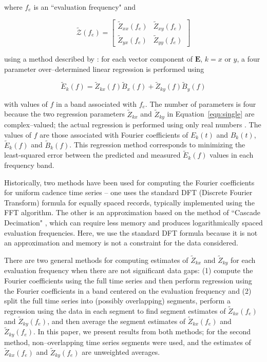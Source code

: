 \documentclass[pdflatex,sn-basic]{sn-jnl}%
\begin{document}
\noindent where $f_e$ is an ``evaluation frequency" and

\begin{equation}
  \boldsymbol{\mathcal{\widetilde{Z}}}(f_e) = 
    \begin{bmatrix}
      \widetilde{Z}_{xx}(f_e) & \widetilde{Z}_{xy}(f_e)\\
      \widetilde{Z}_{yx}(f_e) & \widetilde{Z}_{yy}(f_e)
    \end{bmatrix}
\end{equation}

\noindent using a method described by \cite{Sims1971}: for each vector component of $\mathbf{E}$, $k=x\mbox{ or }y$, a four parameter over--determined linear regression is performed using

\begin{equation}
  \widetilde{E}_k(f) = \widetilde{Z}_{kx}(f)\widetilde{B}_x(f) + \widetilde{Z}_{ky}(f)\widetilde{B}_y(f)
  \label{eqn:single}
\end{equation}

\noindent with values of $f$ in a band associated with $f_e$. The number of parameters is four because the two regression parameters $\widetilde{Z}_{kx}$ and $\widetilde{Z}_{ky}$ in Equation~\ref{eqn:single} are complex--valued; the actual regression is performed using only real numbers \citep{Egbert1986}. The values of $f$ are those associated with Fourier coefficients of $E_k(t)$ and $B_k(t)$, $\widetilde{E}_k(f)$ and $\widetilde{B}_k(f)$. This regression method corresponds to minimizing the least-squared error between the predicted and measured $\widetilde{E}_k(f)$ values in each frequency band.

Historically, two methods have been used for computing the Fourier coefficients for uniform cadence time series -- one uses the standard DFT (Discrete Fourier Transform) formula for equally spaced records, typically implemented using the FFT algorithm. The other is an approximation based on the method of ``Cascade Decimation" \citep{Wight1980}, which can require less memory and produces logarithmically spaced evaluation frequencies. Here, we use the standard DFT formula because it is not an approximation and memory is not a constraint for the data considered.

There are two general methods for computing estimates of $\widetilde{Z}_{kx}$ and $\widetilde{Z}_{ky}$ for each evaluation frequency when there are not significant data gaps: (1) compute the Fourier coefficients using the full time series and then perform regression using the Fourier coefficients in a band centered on the evaluation frequency and (2) split the full time series into (possibly overlapping) segments, perform a regression using the data in each segment to find segment estimates of $\widetilde{Z}_{kx}(f_e)$ and $\widetilde{Z}_{ky}(f_e)$, and then average the segment estimates of $\widetilde{Z}_{kx}(f_e)$ and $\widetilde{Z}_{ky}(f_e)$. In this paper, we present results from both methods; for the second method, non--overlapping time series segments were used, and the estimates of $\widetilde{Z}_{kx}(f_e)$ and $\widetilde{Z}_{ky}(f_e)$ are unweighted averages.
\end{document}
